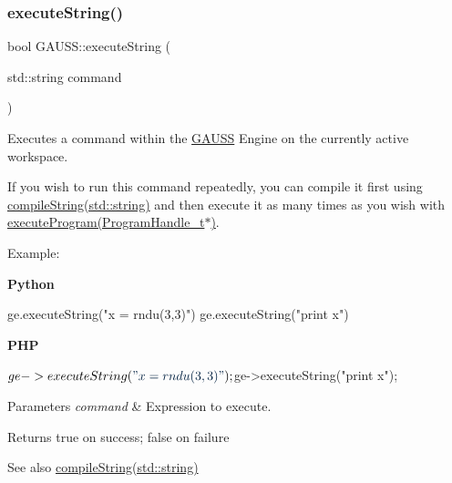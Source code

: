 \subsubsection{\texorpdfstring{execute\+String()}{executeString()}\hspace{0.1cm}{\footnotesize\ttfamily [1/2]}}
{\footnotesize\ttfamily bool G\+A\+U\+S\+S\+::execute\+String (\begin{DoxyParamCaption}\item[{std\+::string}]{command }\end{DoxyParamCaption})}



Executes a command within the \hyperlink{class_g_a_u_s_s}{G\+A\+U\+SS} Engine on the currently active workspace. 

If you wish to run this command repeatedly, you can compile it first using \hyperlink{class_g_a_u_s_s_a3ecf1522874c8ae5aa8fb8173d515b73}{compile\+String(std\+::string)} and then execute it as many times as you wish with \hyperlink{class_g_a_u_s_s_a7fc9de69421c14aadb9a6310fecabcca}{execute\+Program(\+Program\+Handle\+\_\+t$\ast$)}.

Example\+:

{\bfseries Python} 
\begin{DoxyCode}
ge.executeString(\textcolor{stringliteral}{"x = rndu(3,3)"})
ge.executeString(\textcolor{stringliteral}{"print x"})
\end{DoxyCode}


{\bfseries P\+HP} 
\begin{DoxyCode}
$ge->executeString(\textcolor{stringliteral}{"x = rndu(3,3)"});
$ge->executeString(\textcolor{stringliteral}{"print x"});
\end{DoxyCode}



\begin{DoxyParams}{Parameters}
{\em command} & Expression to execute. \\
\hline
\end{DoxyParams}
\begin{DoxyReturn}{Returns}
true on success; false on failure
\end{DoxyReturn}
\begin{DoxySeeAlso}{See also}
\hyperlink{class_g_a_u_s_s_a3ecf1522874c8ae5aa8fb8173d515b73}{compile\+String(std\+::string)} 
\end{DoxySeeAlso}
\mbox{\label{class_g_a_u_s_s_add35ed82380ee718cb2638350956ee9c}} 
